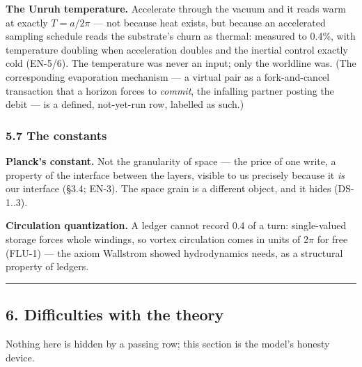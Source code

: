 \documentclass[
  11pt,
]{article}
\begin{document}
\textbf{The Unruh temperature.} Accelerate through the vacuum and it
reads warm at exactly $T = a/2\pi$ --- not because heat exists, but because
an accelerated sampling schedule reads the substrate's churn as thermal:
measured to 0.4\%, with temperature doubling when acceleration doubles
and the inertial control exactly cold (EN-5/6). The temperature was
never an input; only the worldline was. (The corresponding evaporation
mechanism --- a virtual pair as a fork-and-cancel transaction that a
horizon forces to \emph{commit}, the infalling partner posting the debit
--- is a defined, not-yet-run row, labelled as such.)

\subsubsection{5.7 The constants}\label{the-constants}

\textbf{Planck's constant.} Not the granularity of space --- the price
of one write, a property of the interface between the layers, visible to
us precisely because it \emph{is} our interface (\S{}3.4; EN-3). The space
grain is a different object, and it hides (DS-1..3).

\textbf{Circulation quantization.} A ledger cannot record 0.4 of a turn:
single-valued storage forces whole windings, so vortex circulation comes
in units of $2\pi$ for free (FLU-1) --- the axiom Wallstrom showed
hydrodynamics needs, as a structural property of ledgers.

\begin{center}\rule{0.5\linewidth}{0.5pt}\end{center}

\subsection{6. Difficulties with the
theory}\label{difficulties-with-the-theory}

Nothing here is hidden by a passing row; this section is the model's
honesty device.
\end{document}

